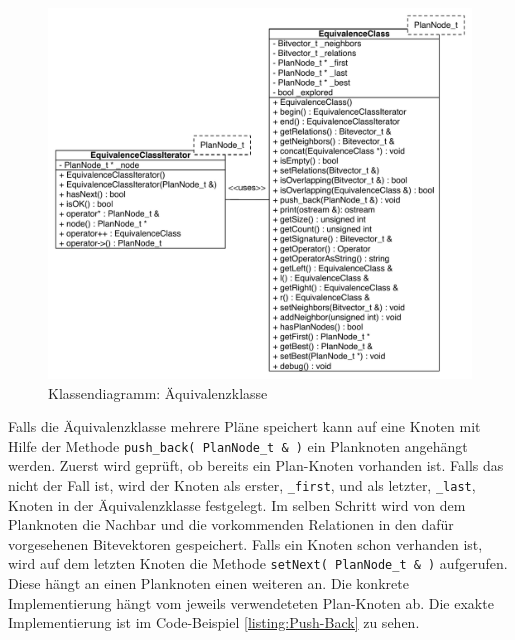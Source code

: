 \begin{figure}[ht]
  \centering
  \includegraphics[width=1\textwidth]{04_Implementierung/00_media/ClassEquivalenceClass.pdf}
  \caption{Klassendiagramm: Äquivalenzklasse}
  \label{ClassEquivalenceClass}
\end{figure}


Falls die Äquivalenzklasse mehrere Pläne speichert kann auf eine Knoten mit Hilfe der Methode \texttt{push\_back( PlanNode\_t \& )} ein Planknoten angehängt werden. Zuerst wird geprüft, ob bereits ein Plan-Knoten vorhanden ist. Falls das nicht der Fall ist, wird der Knoten als erster, \texttt{\_first}, und als letzter, \texttt{\_last}, Knoten in der Äquivalenzklasse festgelegt. Im selben Schritt wird von dem Planknoten die Nachbar und die vorkommenden Relationen in den dafür vorgesehenen Bitevektoren gespeichert. Falls ein Knoten schon verhanden ist, wird auf dem letzten Knoten die Methode \texttt{setNext( PlanNode\_t \& )} aufgerufen. Diese hängt an einen Planknoten einen weiteren an. Die konkrete Implementierung hängt vom jeweils verwendeteten Plan-Knoten ab. Die exakte Implementierung ist im Code-Beispiel \ref{listing:Push-Back} zu sehen.

\begin{minipage}{\linewidth}
\linespread{0.5}
\end{minipage}

